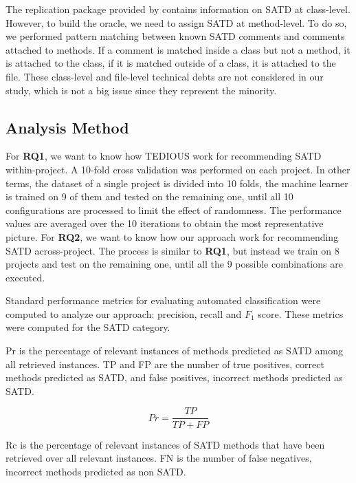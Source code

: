 The replication package provided by \citet{maldonado17} contains information on \ac{SATD} at class-level. However, to build the oracle, we need to assign \ac{SATD} at method-level. To do so, we performed pattern matching between known \ac{SATD} comments and comments attached to methods. If a comment is matched inside a class but not a method, it is attached to the class, if it is matched outside of a class, it is attached to the file. These class-level and file-level technical debts are not considered in our study, which is not a big issue since they represent the minority.

\subsection{Analysis Method}


For \textbf{RQ1}, we want to know how \ac{TEDIOUS} work for recommending \ac{SATD} within-project. A 10-fold cross validation was performed on each project. In other terms, the dataset of a single project is divided into 10 folds, the machine learner is trained on 9 of them and tested on the remaining one, until all 10 configurations are processed to limit the effect of randomness. The performance values are averaged over the 10 iterations to obtain the most representative picture. For \textbf{RQ2}, we want to know how our approach work for recommending \ac{SATD} across-project. The process is similar to \textbf{RQ1}, but instead we train on 8 projects and test on the remaining one, until all the 9 possible combinations are executed. \par 

Standard performance metrics for evaluating automated classification were computed to analyze our approach: precision, recall and $F_{1}$ score. These metrics were computed for the \ac{SATD} category. \par 

\ac{Pr} is the percentage of relevant instances of methods predicted as \ac{SATD} among all retrieved instances. \ac{TP} and \ac{FP} are the number of true positives, correct methods predicted as \ac{SATD}, and false positives, incorrect methods predicted as \ac{SATD}.

\[
Pr=\frac{TP}{TP+FP}
\]

\ac{Rc} is the percentage of relevant instances of \ac{SATD} methods that have been retrieved over all relevant instances. \ac{FN} is the number of false negatives, incorrect methods predicted as non \ac{SATD}.

